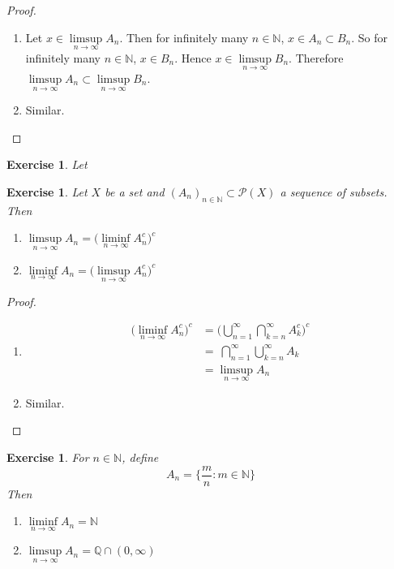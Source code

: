 \documentclass[12pt]{amsart}
\newtheorem{ex}[thm]{Exercise}
\newcommand{\N}{\mathbb{N}}
\newcommand{\Q}{\mathbb{Q}}
\newcommand{\MP}{\mathcal{P}}
\begin{document}
\begin{proof}\
\begin{enumerate}
\item Let $x \in \limsup\limits_{n \rightarrow \infty}A_n$. Then for infinitely many $n \in \N$, $x \in A_n \subset B_n$. So for infinitely many $n \in \N$, $x \in B_n$. Hence $x \in \limsup\limits_{n \rightarrow \infty}B_n$. Therefore $\limsup\limits_{n \rightarrow \infty}A_n \subset \limsup\limits_{n \rightarrow \infty}B_n$.
\item Similar.
\end{enumerate}
\end{proof}

\begin{ex}
Let 
\end{ex}

\begin{ex}
Let $X$ be a set and $(A_n)_{n \in \N} \subset \MP(X)$ a sequence of subsets. Then 
\begin{enumerate}
\item $\limsup\limits_{n \rightarrow \infty}A_n = \bigg(\liminf\limits_{n \rightarrow \infty}A_n^c \bigg)^c$
\item $\liminf\limits_{n \rightarrow \infty}A_n = \bigg(\limsup\limits_{n \rightarrow \infty}A_n^c \bigg)^c$
\end{enumerate}
\end{ex}

\begin{proof}\
\begin{enumerate}
\item \begin{align*}
\bigg( \liminf\limits_{n \rightarrow \infty}A_n^c \bigg)^c 
&= \bigg( \bigcup\limits_{n=1}^{\infty} \bigcap\limits_{k=n}^{\infty}A_k^c \bigg)^c\\
&= \ \bigcap\limits_{n=1}^{\infty}\bigcup\limits_{k=n}^{\infty}A_k  \\
&=  \limsup\limits_{n \rightarrow \infty}A_n
\end{align*}
\item Similar.
\end{enumerate}
\end{proof}\newpage

\begin{ex}
For $n \in \N$, define $$A_n = \bigg\{ \frac{m}{n}: m \in \N \bigg\}$$ 
Then
\begin{enumerate}
\item $\liminf\limits_{n \rightarrow \infty }A_n = \N$ 
\item $\limsup\limits_{n \rightarrow \infty }A_n = \Q \cap (0,\infty )$
\end{enumerate}
\end{ex}
\end{document}
